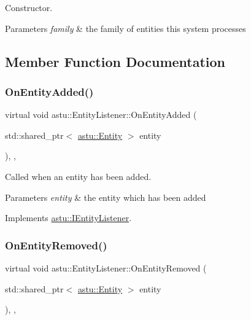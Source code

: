Constructor.


\begin{DoxyParams}{Parameters}
{\em family} & the family of entities this system processes \\
\hline
\end{DoxyParams}


\subsection{Member Function Documentation}
\mbox{\label{classastu_1_1EntityListener_a0c123b57dcabc4c2b6cee8f05db545c8}} 
\subsubsection{\texorpdfstring{On\+Entity\+Added()}{OnEntityAdded()}}
{\footnotesize\ttfamily virtual void astu\+::\+Entity\+Listener\+::\+On\+Entity\+Added (\begin{DoxyParamCaption}\item[{std\+::shared\+\_\+ptr$<$ \hyperlink{classastu_1_1Entity}{astu\+::\+Entity} $>$}]{entity }\end{DoxyParamCaption})\hspace{0.3cm}{\ttfamily [inline]}, {\ttfamily [override]}, {\ttfamily [virtual]}}

Called when an entity has been added.


\begin{DoxyParams}{Parameters}
{\em entity} & the entity which has been added \\
\hline
\end{DoxyParams}


Implements \hyperlink{classastu_1_1IEntityListener_afa087302fdf0bd999297b0d35ceb1f61}{astu\+::\+I\+Entity\+Listener}.

\mbox{\label{classastu_1_1EntityListener_ae380d941fafd6933a9f290ac50e7f32b}} 
\subsubsection{\texorpdfstring{On\+Entity\+Removed()}{OnEntityRemoved()}}
{\footnotesize\ttfamily virtual void astu\+::\+Entity\+Listener\+::\+On\+Entity\+Removed (\begin{DoxyParamCaption}\item[{std\+::shared\+\_\+ptr$<$ \hyperlink{classastu_1_1Entity}{astu\+::\+Entity} $>$}]{entity }\end{DoxyParamCaption})\hspace{0.3cm}{\ttfamily [inline]}, {\ttfamily [override]}, {\ttfamily [virtual]}}

